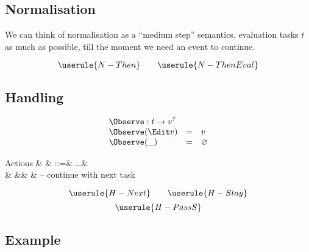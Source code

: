 \subsection{Normalisation}

We can think of normalisation as a \enquote{medium step} semantics,
evaluation tasks $t$ as much as possible,
till the moment we need an event to continue.

\begin{equation*}
  \userule{N-Then} \qquad \userule{N-ThenEval}
\end{equation*}

\subsection{Handling}

\begin{equation*}
  \begin{array}{lcl}
    \multicolumn{3}{l}{\Observe : t \to v^?} \\
    \Observe(\Edit v) &=& v \\
    \Observe(\_)      &=& \nothing
  \end{array}
\end{equation*}

\begin{grammar}
  Actions
    & \alpha & ::=& \ldots & \\
    &        &\mid& \Next  & – continue with next task \\
\end{grammar}

\begin{equation*}
  \userule{H-Next} \qquad \userule{H-Stay}
\end{equation*}
\begin{equation*}
  \userule{H-PassS}
\end{equation*}

\subsection{Example}
